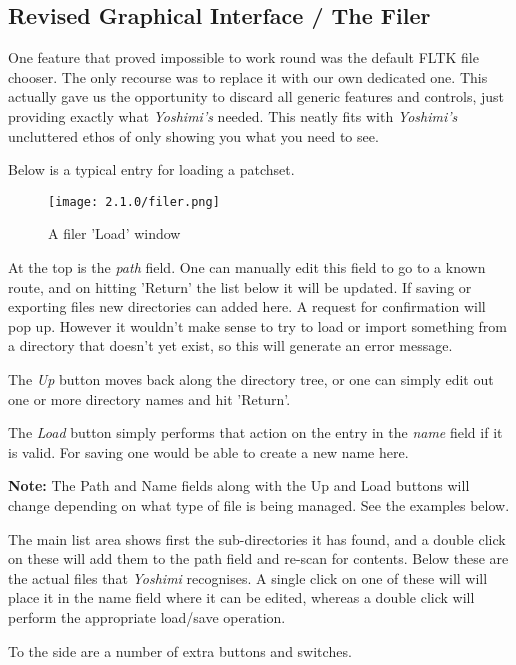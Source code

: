 \subsection{Revised Graphical Interface / The Filer}
\label{subsec:interface_filer}
   One feature that proved impossible to work round was the default FLTK file
   chooser. The only recourse was to replace it with our own dedicated one. This
   actually gave us the opportunity to discard all generic features and controls,
   just providing exactly what \textsl{Yoshimi's} needed. This neatly fits with
   \textsl{Yoshimi's} uncluttered ethos of only showing you what you need to see.

   Below is a typical entry for loading a patchset.
\begin{figure}[H]
   \centering
   \texttt{[image: 2.1.0/filer.png]}
   \caption{A filer 'Load' window}
   \label{fig:filer_load_window}
\end{figure}


   At the top is the \textsl{path} field. One can manually edit this field to go
   to a known route, and on hitting 'Return' the list below it will be updated.
   If saving or exporting files new directories can added here. A request for
   confirmation will pop up. However it wouldn't make sense to try to load or
   import something from a directory that doesn't yet exist, so this will
   generate an error message.

   The \textsl{Up} button moves back along the directory tree, or one can simply
   edit out one or more directory names and hit 'Return'.

   The \textsl{Load} button simply performs that action on the entry in the
   \textsl{name} field if it is valid. For saving one would be able to create a
   new name here.

    \textbf{Note:} The Path and Name fields along with the Up and Load buttons
    will change depending on what type of file is being managed. See the examples
    below.

   The main list area shows first the sub-directories it has found, and a double
   click on these will add them to the path field and re-scan for contents. Below
   these are the actual files that \textsl{Yoshimi} recognises. A single click on
   one of these will will place it in the name field where it can be edited,
   whereas a double click will perform the appropriate load/save operation.

   To the side are a number of extra buttons and switches.

